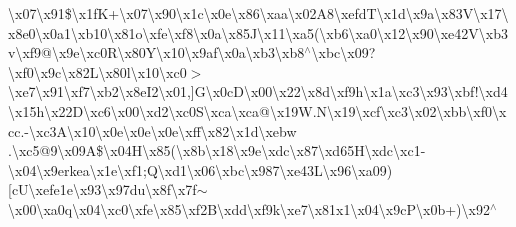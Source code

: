\textbackslash{}x07\textbackslash{}x91\$\textbackslash{}x1f\+K+\textbackslash{}x07\textbackslash{}x90\textbackslash{}x1c\textbackslash{}x0e\textbackslash{}x86\textbackslash{}xaa\textbackslash{}x02\+A8\textbackslash{}xefd\+T\textbackslash{}x1d\textbackslash{}x9a\textbackslash{}x83\+V\textbackslash{}x17\textbackslash{}x8e0\textbackslash{}x0a1\textbackslash{}xb10\textbackslash{}x81o\textbackslash{}xfe\textbackslash{}xf8\textbackslash{}x0a\textbackslash{}x85\+J\textbackslash{}x11\textbackslash{}xa5(\textbackslash{}xb6\textbackslash{}xa0\textbackslash{}x12\textbackslash{}x90\textbackslash{}xe42\+V\textbackslash{}xb3v\textbackslash{}xf9@\textbackslash{}x9e\textbackslash{}xc0\+R\textbackslash{}x80\+Y\textbackslash{}x10\textbackslash{}x9af\textbackslash{}x0a\textbackslash{}xb3\textbackslash{}xb8$^\wedge$\textbackslash{}xbc\textbackslash{}x09?\textbackslash{}xf0\textbackslash{}x9c\textbackslash{}x82\+L\textbackslash{}x80l\textbackslash{}x10\textbackslash{}xc0$>$\textbackslash{}xe7\textbackslash{}x91\textbackslash{}xf7\textbackslash{}xb2\textbackslash{}x8e\+I2\textbackslash{}x01,\mbox{]}\+G\textbackslash{}x0c\+D\textbackslash{}x00\textbackslash{}x22\textbackslash{}x8d\textbackslash{}xf9h\textbackslash{}x1a\textbackslash{}xc3\textbackslash{}x93\textbackslash{}xbf!\textbackslash{}xd4\textbackslash{}x15h\textbackslash{}x22\+D\textbackslash{}xc6\textbackslash{}x00\textbackslash{}xd2\textbackslash{}xc0\+S\textbackslash{}xca\textbackslash{}xca@\textbackslash{}x19\+W.\+N\textbackslash{}x19\textbackslash{}xcf\textbackslash{}xc3\textbackslash{}x02\textbackslash{}xbb\textbackslash{}xf0\textbackslash{}xcc.-\/\textbackslash{}xc3\+A\textbackslash{}x10\textbackslash{}x0e\textbackslash{}x0e\textbackslash{}x0e\textbackslash{}xff\textbackslash{}x82\textbackslash{}x1d\textbackslash{}xebw .\textbackslash{}xc5@9\textbackslash{}x09\+A\$\textbackslash{}x04\+H\textbackslash{}x85(\textbackslash{}x8b\textbackslash{}x18\textbackslash{}x9e\textquotesingle{}\textbackslash{}xdc\textbackslash{}x87\textbackslash{}xd65\+H\textbackslash{}xdc\textbackslash{}xc1-\/\textbackslash{}x04\textbackslash{}x9erkea\textbackslash{}x1e\textbackslash{}xf1;\+Q\textbackslash{}xd1\textbackslash{}x06\textbackslash{}xbc\textbackslash{}x987\textbackslash{}xe43\+L\textbackslash{}x96\textbackslash{}xa09)\mbox{[}c\+U\textbackslash{}xefe1e\textbackslash{}x93\textbackslash{}x97du\textbackslash{}x8f\textbackslash{}x7f$\sim$\textbackslash{}x00\textbackslash{}xa0q\textbackslash{}x04\textbackslash{}xc0\textbackslash{}xfe\textbackslash{}x85\textbackslash{}xf2\+B\textbackslash{}xdd\textbackslash{}xf9k\textbackslash{}xe7\textbackslash{}x81x1\textbackslash{}x04\textbackslash{}x9c\+P\textbackslash{}x0b+)\textbackslash{}x92$^\wedge$ 
